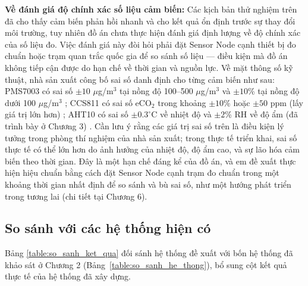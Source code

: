 \documentclass[../DoAn.tex]{subfiles}
\begin{document}
\textbf{Về đánh giá độ chính xác số liệu cảm biến:} Các kịch bản thử nghiệm trên đã cho thấy cảm biến phản hồi nhanh và cho kết quả ổn định trước sự thay đổi môi trường, tuy nhiên đồ án chưa thực hiện đánh giá định lượng về độ chính xác của số liệu đo. Việc đánh giá này đòi hỏi phải đặt Sensor Node cạnh thiết bị đo chuẩn hoặc trạm quan trắc quốc gia để so sánh số liệu — điều kiện mà đồ án không tiếp cận được do hạn chế về thời gian và nguồn lực. Về mặt thông số kỹ thuật, nhà sản xuất công bố sai số danh định cho từng cảm biến như sau: PMS7003 có sai số $\pm 10$ $\mu$g/m$^3$ tại nồng độ 100--500 $\mu$g/m$^3$ và $\pm 10$\% tại nồng độ dưới 100 $\mu$g/m$^3$ \cite{plantower2023}; CCS811 có sai số eCO$_2$ trong khoảng $\pm 10$\% hoặc $\pm 50$ ppm (lấy giá trị lớn hơn) \cite{ams2023}; AHT10 có sai số $\pm 0.3^{\circ}$C về nhiệt độ và $\pm 2$\% RH về độ ẩm (đã trình bày ở Chương 3) \cite{aosong2023}. Cần lưu ý rằng các giá trị sai số trên là điều kiện lý tưởng trong phòng thí nghiệm của nhà sản xuất; trong thực tế triển khai, sai số thực tế có thể lớn hơn do ảnh hưởng của nhiệt độ, độ ẩm cao, và sự lão hóa cảm biến theo thời gian. Đây là một hạn chế đáng kể của đồ án, và em đề xuất thực hiện hiệu chuẩn bằng cách đặt Sensor Node cạnh trạm đo chuẩn trong một khoảng thời gian nhất định để so sánh và bù sai số, như một hướng phát triển trong tương lai (chi tiết tại Chương 6).

\subsection{So sánh với các hệ thống hiện có}
\label{subsection:4.5.2}

Bảng \ref{table:so_sanh_ket_qua} đối sánh hệ thống đề xuất với bốn hệ thống đã khảo sát ở Chương 2 (Bảng~\ref{table:so_sanh_he_thong}), bổ sung cột kết quả thực tế của hệ thống đã xây dựng.
\end{document}
